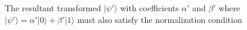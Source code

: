 \documentclass[preview]{standalone}
\begin{document}
\begin{center}
The resultant transformed $|\psi'\rangle$ with coefficients $\alpha'$ and $\beta'$ where $|\psi'\rangle = \alpha'|0\rangle + \beta'|1\rangle$ must also satisfy the normalization condition
\end{center}
\end{document}
